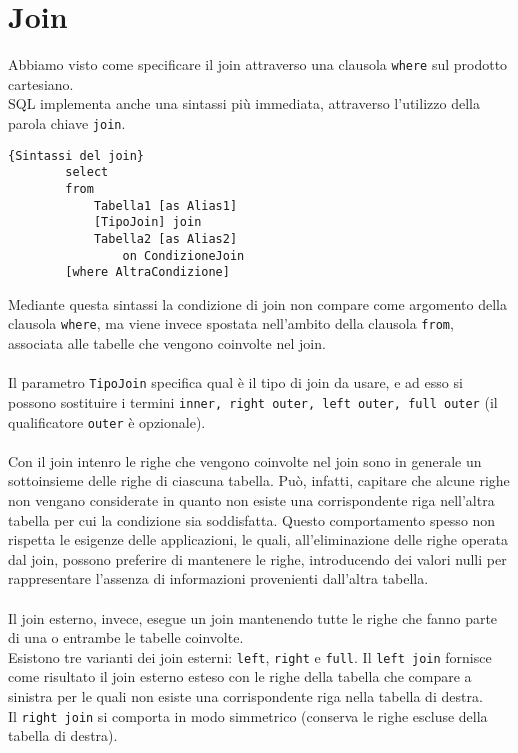 \chapter{Join}

Abbiamo visto come specificare il join attraverso una clausola \texttt{where} sul prodotto cartesiano.\\
SQL implementa anche una sintassi più immediata, attraverso l'utilizzo della parola chiave \texttt{join}.
    \begin{lstlisting}{Sintassi del join}
        select
        from
            Tabella1 [as Alias1]
            [TipoJoin] join 
            Tabella2 [as Alias2]
                on CondizioneJoin
        [where AltraCondizione]
    \end{lstlisting}
Mediante questa sintassi la condizione di join non compare come argomento della clausola \texttt{where}, ma viene invece spostata nell'ambito della clausola \texttt{from}, associata alle tabelle che vengono coinvolte nel join.\\\\
Il parametro \texttt{TipoJoin} specifica qual è il tipo di join da usare, e ad esso si possono sostituire i termini \texttt{inner, right outer, left outer, full outer} (il qualificatore \texttt{outer} è opzionale).\\\\
Con il join intenro le righe che vengono coinvolte nel join sono in generale un sottoinsieme delle righe di ciascuna tabella. Può, infatti, capitare che alcune righe non vengano considerate in quanto non esiste una corrispondente riga nell'altra tabella per cui la condizione sia soddisfatta. Questo comportamento spesso non rispetta le esigenze delle applicazioni, le quali, all'eliminazione delle righe operata dal join, possono preferire di mantenere le righe, introducendo dei valori nulli per rappresentare l'assenza di informazioni provenienti dall'altra tabella.\\\\
Il join esterno, invece, esegue un join mantenendo tutte le righe che fanno parte di una o entrambe le tabelle coinvolte.\\
Esistono tre varianti dei join esterni: \texttt{left}, \texttt{right} e \texttt{full}. Il \texttt{left join} fornisce come risultato il join esterno esteso con le righe della tabella che compare a sinistra per le quali non esiste una corrispondente riga nella tabella di destra.\\
Il \texttt{right join} si comporta in modo simmetrico (conserva le righe escluse della tabella di destra).\\
